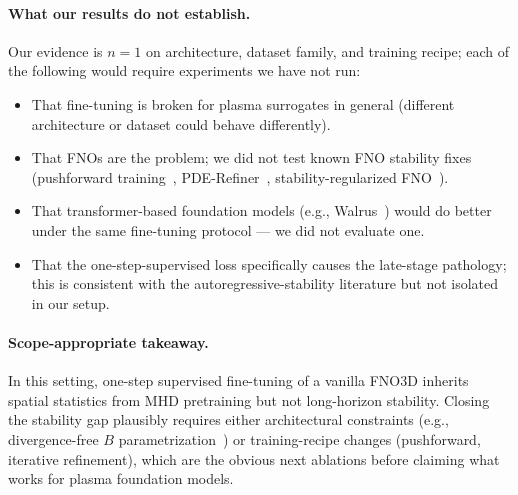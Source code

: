 \documentclass{article}
\begin{document}
\paragraph{What our results do not establish.} Our evidence is $n{=}1$ on architecture, dataset family, and training recipe; each of the following would require experiments we have not run:
\begin{itemize}
  \setlength\itemsep{0.2em}
  \item That fine-tuning is broken for plasma surrogates in general (different architecture or dataset could behave differently).
  \item That FNOs are the problem; we did not test known FNO stability fixes (pushforward training~\cite{brandstetter2022pushforward}, PDE-Refiner~\cite{lippe2023pderefiner}, stability-regularized FNO~\cite{mccabe2023stability}).
  \item That transformer-based foundation models (e.g., Walrus~\cite{mccabe2025walrus}) would do better under the same fine-tuning protocol --- we did not evaluate one.
  \item That the one-step-supervised loss specifically causes the late-stage pathology; this is consistent with the autoregressive-stability literature but not isolated in our setup.
\end{itemize}

\paragraph{Scope-appropriate takeaway.} In this setting, one-step supervised fine-tuning of a vanilla FNO3D inherits spatial statistics from MHD pretraining but not long-horizon stability. Closing the stability gap plausibly requires either architectural constraints (e.g., divergence-free $B$ parametrization~\cite{liu2024conservation,richterpowell2022neural}) or training-recipe changes (pushforward, iterative refinement), which are the obvious next ablations before claiming what works for plasma foundation models.

\small


\end{document}
